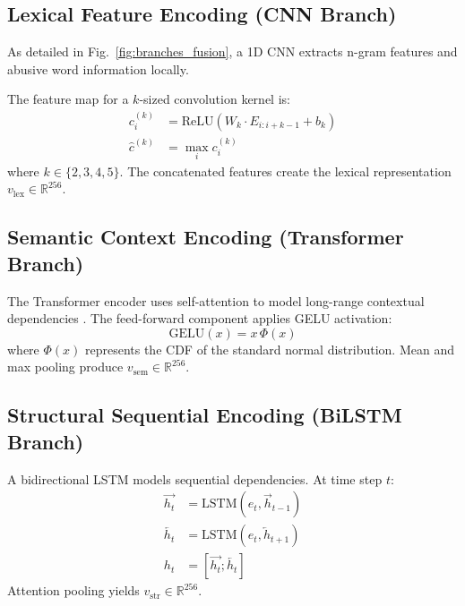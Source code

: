 \subsection{Lexical Feature Encoding (CNN Branch)}

As detailed in Fig.~\ref{fig:branches_fusion}, a 1D CNN extracts n-gram features and abusive word information locally.

The feature map for a $k$-sized convolution kernel is:
\begin{equation}
\begin{aligned}
c_i^{(k)} &= \mathrm{ReLU}(W_k \cdot E_{i:i+k-1} + b_k) \\
\hat{c}^{(k)} &= \max_i c_i^{(k)}
\end{aligned}
\end{equation}
where $k \in \{2,3,4,5\}$. The concatenated features create the lexical representation $v_{\mathrm{lex}} \in \mathbb{R}^{256}$.

\subsection{Semantic Context Encoding (Transformer Branch)}

The Transformer encoder uses self-attention to model long-range contextual dependencies \cite{ref9}. The feed-forward component applies GELU activation:
\begin{equation}
\mathrm{GELU}(x) = x \, \Phi(x)
\end{equation}
where $\Phi(x)$ represents the CDF of the standard normal distribution. Mean and max pooling produce $v_{\mathrm{sem}} \in \mathbb{R}^{256}$.

\subsection{Structural Sequential Encoding (BiLSTM Branch)}

A bidirectional LSTM \cite{ref8} models sequential dependencies. At time step $t$:
\begin{equation}
\begin{aligned}
\overrightarrow{h_t} &= \mathrm{LSTM}(e_t, \overrightarrow{h}_{t-1}) \\
\overleftarrow{h_t} &= \mathrm{LSTM}(e_t, \overleftarrow{h}_{t+1}) \\
h_t &= [\overrightarrow{h_t}; \overleftarrow{h_t}]
\end{aligned}
\end{equation}
Attention pooling yields $v_{\mathrm{str}} \in \mathbb{R}^{256}$.


